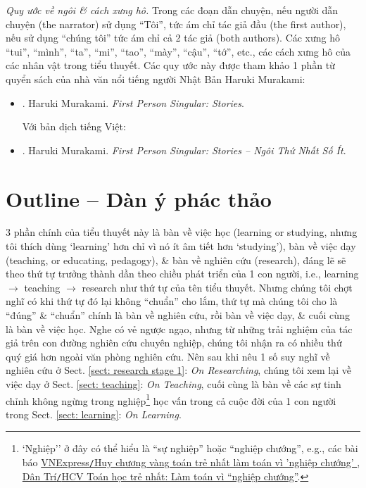 \documentclass[12pt,twoside]{book}
\begin{document}
{\it Quy ước về ngôi \& cách xưng hô.} Trong các đoạn dẫn chuyện, nếu người dẫn chuyện (the narrator) sử dụng ``Tôi'', tức ám chỉ tác giả đầu (the first author), nếu sử dụng ``chúng tôi'' tức ám chỉ cả 2 tác giả (both authors). Các xưng hô ``tui'', ``mình'', ``ta'', ``mi'', ``tao'', ``mày'', ``cậu'', ``tớ'', etc., các cách xưng hô của các nhân vật trong tiểu thuyết. Các quy ước này được tham khảo 1 phần từ quyển sách của nhà văn nổi tiếng người Nhật Bản {\sc Haruki Murakami}:
\begin{itemize}
	\item \cite{Murakami_1st_person}. {\sc Haruki Murakami}. {\it First Person Singular: Stories}.
	
	Với bản dịch tiếng Việt:
	\item \cite{Murakami_ngoi_1}. {\sc Haruki Murakami}. {\it First Person Singular: Stories -- Ngôi Thứ Nhất Số Ít}.
\end{itemize}

\section{Outline -- Dàn ý phác thảo}
3 phần chính của tiểu thuyết này là bàn về việc học (learning or studying, nhưng tôi thích dùng `learning' hơn chỉ vì nó ít âm tiết hơn `studying'), bàn về việc dạy (teaching, or educating, pedagogy), \& bàn về nghiên cứu (research), đáng lẽ sẽ theo thứ tự trưởng thành dần theo chiều phát triển của 1 con người, i.e., learning $\to$ teaching $\to$ research như thứ tự của tên tiểu thuyết. Nhưng chúng tôi chợt nghĩ có khi thứ tự đó lại không ``chuẩn'' cho lắm, thứ tự mà chúng tôi cho là ``đúng'' \& ``chuẩn'' chính là bàn về nghiên cứu, rồi bàn về việc dạy, \& cuối cùng là bàn về việc học. Nghe có vẻ ngược ngạo, nhưng từ những trải nghiệm của tác giả trên con đường nghiên cứu chuyên nghiệp, chúng tôi nhận ra có nhiều thứ quý giá hơn ngoài văn phòng nghiên cứu. Nên sau khi nêu 1 số suy nghĩ về nghiên cứu ở Sect. \ref{sect: research stage 1}: {\it On Researching}, chúng tôi xem lại về việc dạy ở Sect. \ref{sect: teaching}: {\it On Teaching}, cuối cùng là bàn về các sự tinh chỉnh không ngừng trong nghiệp\footnote{`Nghiệp'' ở đây có thể hiểu là ``sự nghiệp'' hoặc ``nghiệp chướng'', e.g., các bài báo \href{https://vnexpress.net/huy-chuong-vang-toan-tre-nhat-lam-toan-vi-nghiep-chuong-2393718.html}{VNExpress{\tt/}Huy chương vàng toán trẻ nhất làm toán vì 'nghiệp chướng' }, \href{https://dantri.com.vn/giao-duc/hcv-toan-hoc-tre-nhat-lam-toan-vi-nghiep-chuong-1354447180.htm}{Dân Trí{\tt/}HCV Toán học trẻ nhất: Làm toán vì ``nghiệp chướng''}.} học vấn trong cả cuộc đời của 1 con người trong Sect. \ref{sect: learning}: {\it On Learning}.
\end{document}
